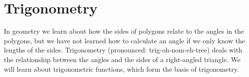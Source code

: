          \chapter{Trigonometry}
    \setcounter{figure}{1}
    \setcounter{subfigure}{1}
    \label{fbcda86bdf0258b6e91dcea5caee5b76}
%     
%     
%     
%   
%             
      \label{m39405*id77510}In geometry we learn about how the sides of polygons relate to the angles in the polygons, but we have not learned how to calculate an angle if we only know the lengths of the sides. Trigonometry (pronounced: trig-oh-nom-eh-tree) deals with the relationship between the angles and the sides of a right-angled triangle. We will learn about trigonometric functions, which form the basis of trigonometry.\par 
\label{m39405*secfhsst!!!underscore!!!id65}
%             
